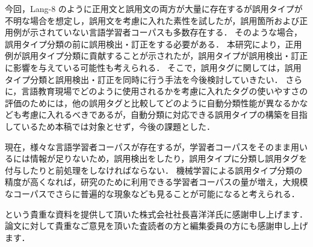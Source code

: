 \documentclass[japanese]{jnlp_1.4}
\newcommand{\lh}{}
\begin{document}
今回，Lang-8 のように正用文と誤用文の両方が大量に存在するが誤用タイプが不明な場合を想定し，誤用文を考慮に入れた素性を試したが，誤用箇所および正用例が示されていない言語学習者コーパスも多数存在する．
そのような場合，誤用タイプ分類の前に誤用検出・訂正をする必要がある．
本研究により，正用例が誤用タイプ分類に貢献することが示されたが，誤用タイプが誤用検出・訂正に影響を与えている可能性も考えられる．
そこで，誤用タグに関しては，誤用タイプ分類と誤用検出・訂正を同時に行う手法を今後検討していきたい．
さらに，言語教育現場でどのように使用されるかを考慮に入れたタグの使いやすさの評価のためには，他の誤用タグと比較してどのように自動分類性能が異なるかなども考慮に入れるべきであるが，自動分類に対応できる誤用タイプの構築を目指しているため本稿では対象とせず，今後の課題とした．

現在，様々な言語学習者コーパスが存在するが，学習者コーパスをそのまま用いるには情報が足りないため，誤用検出をしたり，誤用タイプに分類し誤用タグを付与したりと前処理をしなければならない．
機械学習による誤用タイプ分類の精度が高くなれば，研究のために利用できる学習者コーパスの量が増え，大規模なコーパスでさらに普遍的な現象なども見ることが可能になると考えられる．



\acknowledgment

\lh\hbox{}という貴重な資料を提供して頂いた株式会社\lh\hbox{}社長喜洋洋氏に感謝申し上げます．
論文に対して貴重なご意見を頂いた査読者の方と編集委員の方にも感謝申し上げます．
\end{document}
